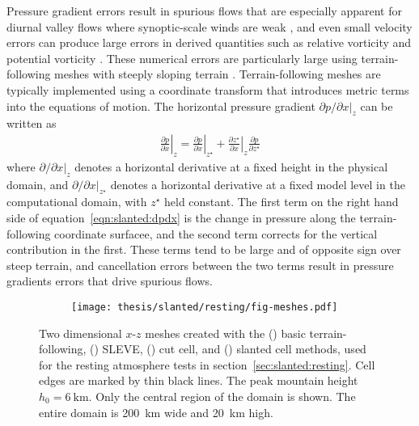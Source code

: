 Pressure gradient errors result in spurious flows that are especially apparent for diurnal valley flows where synoptic-scale winds are weak \citep{fast2003}, and even small velocity errors can produce large errors in derived quantities such as relative vorticity and potential vorticity \citep{hoinka-zaengl2004}.
These numerical errors are particularly large using terrain-following meshes with steeply sloping terrain \citep{zaengl2012}.
Terrain-following meshes are typically implemented using a coordinate transform that introduces metric terms into the equations of motion.  The horizontal pressure gradient $\left. \partial p / \partial x \right|_z$ can be written as \citep{mahrer1984}
\begin{align}
	\left. \frac{\partial p}{\partial x} \right|_z = 
	\left. \frac{\partial p}{\partial x} \right|_{z^\star} +
	\left. \frac{\partial z^\star}{\partial x} \right|_z
	\frac{\partial p}{\partial z^\star} \label{eqn:slanted:dpdx}
\end{align}
where $\left. \partial / \partial x \right|_z$ denotes a horizontal derivative at a fixed height in the physical domain, and $\left. \partial / \partial x \right|_{z^\star}$ denotes a horizontal derivative at a fixed model level in the computational domain, with $z^\star$ held constant.
The first term on the right hand side of equation~\eqref{eqn:slanted:dpdx} is the change in pressure along the terrain-following coordinate surfacee, and the second term corrects for the vertical contribution in the first.
These terms tend to be large and of opposite sign over steep terrain, and cancellation errors between the two terms result in pressure gradients errors that drive spurious flows.

\begin{figure}
	\centering
	\begin{subfigure}{\textwidth}
		\label{fig:slanted:resting:meshes:btf}
		\label{fig:slanted:resting:meshes:sleve}
		\label{fig:slanted:resting:meshes:cutCell}
		\label{fig:slanted:resting:meshes:slantedCell}
		\centering
		\texttt{[image: thesis/slanted/resting/fig-meshes.pdf]}
	\end{subfigure}
%
	\caption{Two dimensional $x$-$z$ meshes created with the
	() basic terrain-following,
	() SLEVE,
	() cut cell, and
	() slanted cell methods, used for the resting atmosphere tests in section~\ref{sec:slanted:resting}.  Cell edges are marked by thin black lines.  The peak mountain height $h_0 = \SI{6}{\kilo\meter}$.
	Only the central region of the domain is shown.  The entire domain is \SI{200}{\kilo\meter} wide and \SI{20}{\kilo\meter} high.}
	\label{fig:slanted:resting:meshes}
\end{figure}

